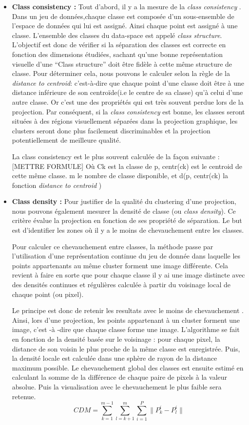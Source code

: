 \begin{itemize}
\item
\textbf{Class consistency : }
\smallskip
Tout d'abord, il y a la mesure de la \textit{class consistency} \cite{bertini2011Class-Consistency}.
 Dans un jeu de données,chaque classe est composée d’un sous-ensemble de l'espace de données qui lui est assigné. Ainsi
chaque point est assigné à une classe. L’ensemble des classes du data-space est appelé
\textit{class structure}.
L'objectif est donc de vérifier si la séparation des classes est correcte en fonction des
dimensions étudiées, sachant qu’une bonne représentation visuelle d’une “Class structure”
doit être fidèle à cette même structure de classe. Pour déterminer cela, nous pouvons le
calculer selon la règle de la \textit{distance to centroid}: c’est-à-dire que
chaque point d’une classe doit être à une distance inférieure de son centroïde(i.e le centre de sa
classe) qu’à celui d’une autre classe.
Or c’est une des propriétés qui est très souvent perdue lors de la projection.
Par conséquent, si la \textit{class consistency} est bonne, les classes seront situées à des régions
visuellement séparées dans la projection graphique, les clusters seront donc plus
facilement discriminables et la projection potentiellement de meilleure qualité.

La class consistency est le plus souvent calculée de la façon suivante : 
[METTRE FORMULE]
Où Ck est la classe de p, centr(ck) est le centroid de cette même classe. m le nombre de classe disponible, et d(p, centr(ck) la fonction \textit{distance to centroid} )
\item
\textbf{Class density : }
\smallskip
 Pour justifier de la qualité du clustering d’une projection, nous pouvons également
mesurer la densité de classe (ou \textit{class density}).
Ce critère évalue la projection en fonction de ses propriété de séparation. Le but est
d'identifier les zones où il y a le moins de chevauchement entre les classes.


Pour calculer ce chevauchement entre classes, la méthode passe par l'utilisation d'une représentation continue du jeu de donnée dans laquelle les points
appartenants au même cluster forment une image différente. Cela revient à faire en sorte que pour chaque classe il y ai une image distincte avec
des densités continues et régulières calculée à partir du voisinage local de chaque point (ou pixel).

Le principe est donc de retenir les resultats avec le moins de chevauchement \cite{AndradaTatu2010visual}.
Ainsi, lors d’une projection, les points appartenant à un cluster forment une image, c'est -à
-dire que chaque classe forme une image.
L’algorithme se fait en fonction de la densité basée sur le voisinage : pour chaque pixel, la
distance de son voisin le plus proche de la même classe est enregistrée. Puis, la densité
locale est calculée dans une sphère de rayon de la distance maximum possible.
Le chevauchement global des classes est ensuite estimé en calculant la somme de la
différence de chaque paire de pixels à la valeur absolue. Puis la visualisation avec le
chevauchement le plus faible sera retenue.
\[CDM =  \sum_{k=1}^{m-1} \sum_{l=k+1}^{m} \sum_{i=1}^{P} \lVert P_{k}^{i} - P_{l}^{i} \rVert \]



\end{itemize}
